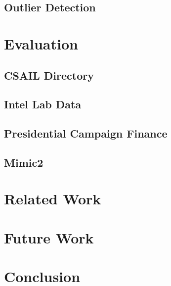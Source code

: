 \documentclass{vldb}
\begin{document}
\subsection{Outlier Detection}
\label{sec:outlier_detection}


\section{Evaluation}
\label{sec:eval}

\subsection{CSAIL Directory}
\label{sec:csail}


\subsection{Intel Lab Data}
\label{sec:intel}


\subsection{Presidential Campaign Finance}
\label{sec:president}


\subsection{Mimic2}
\label{sec:mimic2}


\section{Related Work}
\label{sec:related_work}


\section{Future Work}
\label{sec:future}



\section{Conclusion}
\label{sec:concl}








\end{document}
